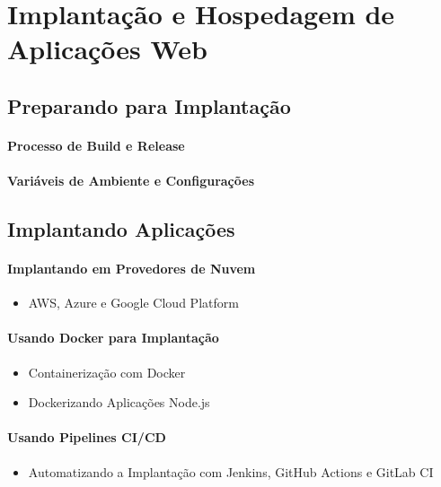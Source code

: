 
\chapter{Implantação e Hospedagem de Aplicações Web}
\section{Preparando para Implantação}

\subsubsection{Processo de Build e Release}
\subsubsection{Variáveis de Ambiente e Configurações}


\section{Implantando Aplicações}

\subsubsection{Implantando em Provedores de Nuvem}
\begin{itemize}
\item AWS, Azure e Google Cloud Platform
\end{itemize}
\subsubsection{Usando Docker para Implantação}
\begin{itemize}
\item Containerização com Docker
\item Dockerizando Aplicações Node.js
\end{itemize}
\subsubsection{Usando Pipelines CI/CD}
\begin{itemize}
\item Automatizando a Implantação com Jenkins, GitHub Actions e GitLab CI
\end{itemize}















